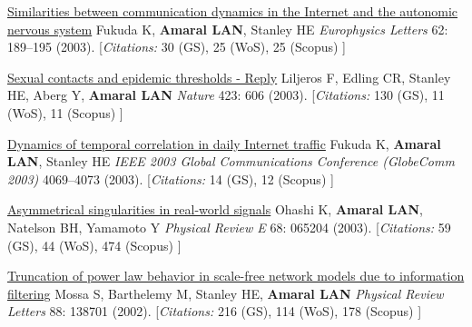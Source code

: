 \NumberedItem{\makebox[0.8cm][r]{[50]}}
\href{/people/amaral/similarities-between-communication-dynamics-in-the-internet-and-the-autonomic-nervous-system}
{Similarities between communication dynamics in the Internet and the autonomic nervous system}
\newline
Fukuda K, {\textbf{Amaral LAN}}, Stanley HE
\newline
\textit{Europhysics Letters}
    62:
189--195 (2003).
    \newline
    \hfill [{\em{Citations:}} 30 (GS),
    25 (WoS), 25 (Scopus)
    ]
\newline
\Gap
~
\Gap

\NumberedItem{\makebox[0.8cm][r]{[49]}}
\href{/people/amaral/sexual-contacts-and-epidemic-thresholds-reply}
{Sexual contacts and epidemic thresholds - Reply}
\newline
Liljeros F, Edling CR, Stanley HE, Aberg Y, {\textbf{Amaral LAN}}
\newline
\textit{Nature}
    423:
606 (2003).
    \newline
    \hfill [{\em{Citations:}} 130 (GS),
    11 (WoS), 11 (Scopus)
    ]
\newline
\Gap
~
\Gap

\NumberedItem{\makebox[0.8cm][r]{[48]}}
\href{/people/amaral/dynamics-of-temporal-correlation-in-daily-internet-traffic}
{Dynamics of temporal correlation in daily Internet traffic}
\newline
Fukuda K, {\textbf{Amaral LAN}}, Stanley HE
\newline
\textit{IEEE 2003 Global Communications Conference (GlobeComm 2003)}
4069--4073 (2003).
    \newline
    \hfill [{\em{Citations:}} 14 (GS), 12 (Scopus)
    ]
\newline
\Gap
~
\Gap

\NumberedItem{\makebox[0.8cm][r]{[47]}}
\href{/people/amaral/asymmetrical-singularities-in-real-world-signals}
{Asymmetrical singularities in real-world signals}
\newline
Ohashi K, {\textbf{Amaral LAN}}, Natelson BH, Yamamoto Y
\newline
\textit{Physical Review E}
    68:
065204 (2003).
    \newline
    \hfill [{\em{Citations:}} 59 (GS),
    44 (WoS), 474 (Scopus)
    ]
\newline
\Gap
~
\Gap

\NumberedItem{\makebox[0.8cm][r]{[46]}}
\href{/people/amaral/truncation-of-power-law-behavior-in-scale-free-network-models-due-to-information-filtering}
{Truncation of power law behavior in scale-free network models due to information filtering}
\newline
Mossa S, Barthelemy M, Stanley HE, {\textbf{Amaral LAN}}
\newline
\textit{Physical Review Letters}
    88:
138701 (2002).
    \newline
    \hfill [{\em{Citations:}} 216 (GS),
    114 (WoS), 178 (Scopus)
    ]
\newline
\Gap
~
\Gap

